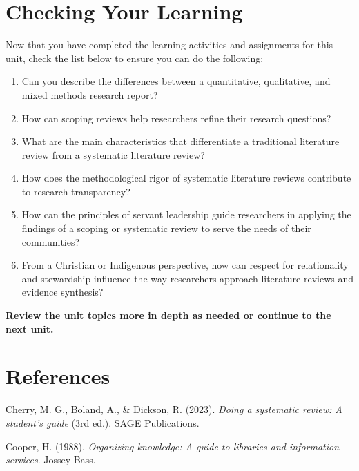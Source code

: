 \documentclass[
  letterpaper,
  DIV=11,
  numbers=noendperiod]{scrreprt}
\providecommand{\tightlist}{%
  \setlength{\itemsep}{0pt}\setlength{\parskip}{0pt}}\usepackage{longtable,booktabs,array}
\begin{document}
\section*{Checking Your Learning}\label{checking-your-learning-1}


Now that you have completed the learning activities and assignments for
this unit, check the list below to ensure you can do the following:

\begin{enumerate}
\def\labelenumi{\arabic{enumi}.}
\tightlist
\item
  Can you describe the differences between a quantitative, qualitative,
  and mixed methods research report?
\item
  How can scoping reviews help researchers refine their research
  questions?
\item
  What are the main characteristics that differentiate a traditional
  literature review from a systematic literature review?
\item
  How does the methodological rigor of systematic literature reviews
  contribute to research transparency?
\item
  How can the principles of servant leadership guide researchers in
  applying the findings of a scoping or systematic review to serve the
  needs of their communities?
\item
  From a Christian or Indigenous perspective, how can respect for
  relationality and stewardship influence the way researchers approach
  literature reviews and evidence synthesis?
\end{enumerate}

\textbf{Review the unit topics more in depth as needed or continue to
the next unit.}

\section*{References}\label{references-1}


Cherry, M. G., Boland, A., \& Dickson, R. (2023). \emph{Doing a
systematic review: A student's guide} (3rd ed.). SAGE Publications.

Cooper, H. (1988). \emph{Organizing knowledge: A guide to libraries and
information services}. Jossey-Bass.
\end{document}
